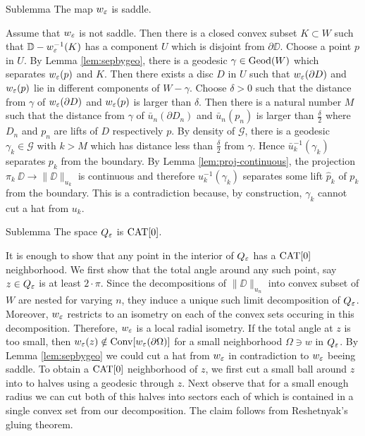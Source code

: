 \documentclass[a4paper,10pt]{amsart}
\begin{document}
\begin{thm}{Sublemma}
 The map $w_\varepsilon$ is saddle.
\end{thm}

Assume that $w_\varepsilon$ is not saddle. Then there is a closed convex subset $K\subset W$ such that $\mathbb{D}-w_\varepsilon^{-1}(K)$
has a component $U$ which is disjoint from $\partial \DD$. Choose a point $p$ in $U$. By Lemma \ref{lem:sepbygeo}, there is  
a geodesic $\gamma\in\mathop{\rm Geod}\nolimits(W)$ which separates $w_\varepsilon(p)$ and $K$.
Then there exists a disc $D$ in $U$ such that
$w_\varepsilon(\partial D)$ and $w_\varepsilon(p)$ lie in different components of $W-\gamma$. Choose $\delta>0$ 
such that the distance from $\gamma$ of $w_\varepsilon(\partial D)$ and $w_\varepsilon(p)$ is larger than $\delta$.
Then there is a natural number $M$ such that the distance from $\gamma$ of $\bar u_n(\partial D_n)$ and $\bar u_n(p_n)$ is larger than $\frac{\delta}{2}$
where $D_n$ and $p_n$ are lifts of $D$ respectively $p$.
By density of $\mathcal{G}$, there is a geodesic $\gamma_k\in \mathcal{G}$ with $k>M$ which has distance less than $\frac{\delta}{2}$ from $\gamma$. 
Hence $\bar u_k^{-1}(\gamma_k)$ separates $p_k$ from the boundary. By Lemma \ref{lem:proj-continuous}, the projection $\pi_k\:\DD\to \|\DD\|_{u_k}$ is continuous
and therefore $u_k^{-1}(\gamma_k)$ separates some lift $\hat p_k$ of $p_k$ from the boundary.
This is a contradiction because, by construction, $\gamma_k$ cannot cut a hat from $u_k$.
\qeds

\begin{thm}{Sublemma}
The space $Q_\varepsilon$ is $\mathop{\rm CAT}\nolimits[0]$. 
\end{thm}

It is enough to show that any point in the interior of $Q_\varepsilon$ has a $\mathop{\rm CAT}\nolimits[0]$ neighborhood.
We first show that the total angle around any such point, say $z\in Q_\varepsilon$ is at least $2\cdot\pi$.
Since the decompositions of $\|\DD\|_{u_n}$ into convex subset of $W$ are nested for varying $n$, they
induce a unique such limit decomposition of $Q_\varepsilon$. Moreover, $w_\varepsilon$ restricts to an isometry on each 
of the convex sets occuring in this decomposition. Therefore, $w_\varepsilon$ is a local radial isometry.
If the total angle at $z$ is too small, then $w_\varepsilon(z)\notin\mathop{\rm Conv}\nolimits [w_\varepsilon (\partial\Omega)]$
for a small neighborhood $\Omega\ni w$ in $Q_\varepsilon$. By Lemma \ref{lem:sepbygeo} we could cut a hat from $w_\varepsilon$
in contradiction to $w_\varepsilon$ beeing saddle.
To obtain a $\mathop{\rm CAT}\nolimits[0]$ neighborhood of $z$, we first cut a small ball around $z$ into to halves using a geodesic through $z$.
Next observe that for a small enough radius we can cut both of this halves into sectors each of which is contained in a single convex set
from our decomposition. The claim follows from Reshetnyak's gluing theorem.
\qeds
\end{document}
